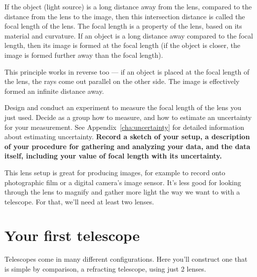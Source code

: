If the object (light source) is a long distance away from the lens, compared to the distance from the lens to the image, then this intersection distance is called the focal length of the lens. The focal length is a property of the lens, based on its material and curvature. If an object is a long distance away compared to the focal length, then its image is formed at the focal length (if the object is closer, the image is formed further away than the focal length).

This principle works in reverse too --- if an object is placed at the focal length of the lens, the rays come out parallel on the other side. The image is effectively formed an infinite distance away.

\begin{steps}
	\item Design and conduct an experiment to measure the focal length of the lens you just used. Decide as a group how to measure, and how to estimate an uncertainty for your measurement. See Appendix\ \ref{cha:uncertainty} for detailed information about estimating uncertainty. \textbf{Record a sketch of your setup, a description of your procedure for gathering and analyzing your data, and the data itself, including your value of focal length with its uncertainty.}

\end{steps}

This lens setup is great for producing images, for example to record onto photographic film or a digital camera's image sensor. It's less good for looking through the lens to magnify and gather more light the way we want to with a telescope. For that, we'll need at least two lenses.

\section{Your first telescope}

Telescopes come in many different configurations. Here you'll construct one that is simple by comparison, a refracting telescope, using just 2 lenses.

